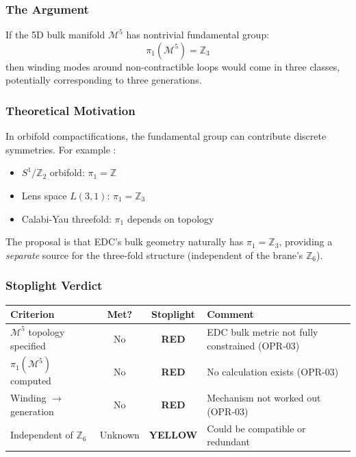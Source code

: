 \subsubsection{The Argument}

If the 5D bulk manifold $\mathcal{M}^5$ has nontrivial fundamental group:
\begin{equation}
    \pi_1(\mathcal{M}^5) = \mathbb{Z}_3
    \label{eq:ch5_pi1}
\end{equation}
then winding modes around non-contractible loops would come in three classes,
potentially corresponding to three generations.

\subsubsection{Theoretical Motivation}

In orbifold compactifications, the fundamental group can contribute discrete
symmetries. For example \tagBL{}:
\begin{itemize}[nosep]
    \item $S^1/\mathbb{Z}_2$ orbifold: $\pi_1 = \mathbb{Z}$
    \item Lens space $L(3,1)$: $\pi_1 = \mathbb{Z}_3$
    \item Calabi-Yau threefold: $\pi_1$ depends on topology
\end{itemize}

The proposal is that EDC's bulk geometry naturally has $\pi_1 = \mathbb{Z}_3$,
providing a \emph{separate} source for the three-fold structure (independent
of the brane's $\mathbb{Z}_6$).

\subsubsection{Stoplight Verdict}

\begin{center}
\small
\begin{tabular}{p{3cm}ccp{5cm}}
\toprule
\textbf{Criterion} & \textbf{Met?} & \textbf{Stoplight} & \textbf{Comment} \\
\midrule
$\mathcal{M}^5$ topology specified & No & \textcolor{red!80!black}{\textbf{RED}} & EDC bulk metric not fully constrained (OPR-03) \\
$\pi_1(\mathcal{M}^5)$ computed & No & \textcolor{red!80!black}{\textbf{RED}} & No calculation exists (OPR-03) \\
Winding $\to$ generation & No & \textcolor{red!80!black}{\textbf{RED}} & Mechanism not worked out (OPR-03) \\
Independent of $\mathbb{Z}_6$ & Unknown & \textcolor{orange!80!black}{\textbf{YELLOW}} & Could be compatible or redundant \\
\bottomrule
\end{tabular}
\end{center}

